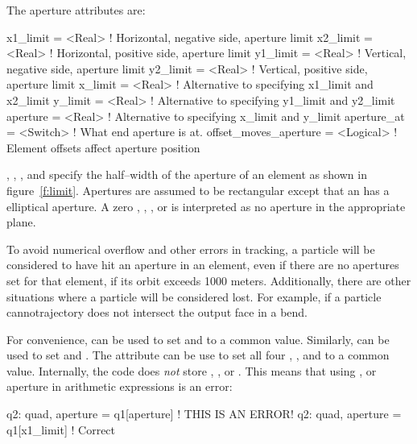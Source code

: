 The aperture attributes are:
\begin{example}
  x1_limit    = <Real>      ! Horizontal, negative side, aperture limit
  x2_limit    = <Real>      ! Horizontal, positive side, aperture limit
  y1_limit    = <Real>      ! Vertical, negative side, aperture limit
  y2_limit    = <Real>      ! Vertical, positive side, aperture limit
  x_limit     = <Real>      ! Alternative to specifying x1_limit and x2_limit
  y_limit     = <Real>      ! Alternative to specifying y1_limit and y2_limit
  aperture    = <Real>      ! Alternative to specifying x_limit and y_limit
  aperture_at = <Switch>    ! What end aperture is at.
  offset_moves_aperture = <Logical> ! Element offsets affect aperture position
\end{example}
, , , and  specify
the half--width of the aperture of an element as shown in
figure~\ref{f:limit}. Apertures are assumed to be rectangular except
that an  has a elliptical aperture. 
A zero , , , or
 is interpreted as no aperture in the appropriate plane.

To avoid numerical overflow and other errors in tracking, a particle
will be considered to have hit an aperture in an element, even if
there are no apertures set for that element, if its orbit exceeds 1000
meters. Additionally, there are other situations where a particle will
be considered lost. For example, if a particle cannotrajectory does
not intersect the output face in a bend.

For convenience,  can be used to set  and
 to a common value. Similarly,  can be used
to set  and .  The  attribute
can be use to set all four , , 
and  to a common value. Internally, the \bmad code does {\em not}
store , , or . This means that
using ,  or aperture in arithmetic expressions is
an error:
\begin{example}
  q2: quad, aperture = q1[aperture]   ! THIS IS AN ERROR!
  q2: quad, aperture = q1[x1_limit]   ! Correct
\end{example}

